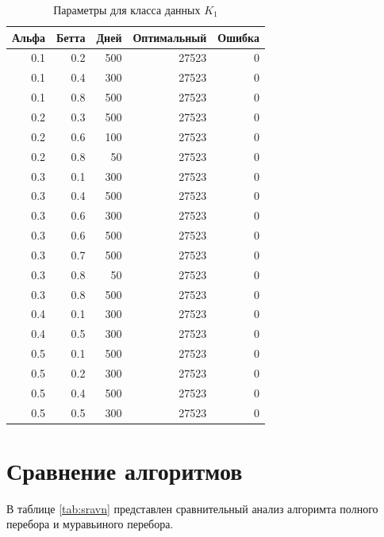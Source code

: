 \begin{table}[!ht]
    \centering
    \caption{\label{tab:par} Параметры для класса данных $K_{1}$}
    \begin{tabular}{|r|r|r|r|r|}
    \hline
        Альфа & Бетта & Дней & Оптимальный & Ошибка  \\ \hline
        0.1 & 0.2 & 500 & 27523 & 0  \\ \hline
        0.1 & 0.4 & 300 & 27523 & 0  \\ \hline
        0.1 & 0.8 & 500 & 27523 & 0  \\ \hline
        0.2 & 0.3 & 500 & 27523 & 0  \\ \hline
        0.2 & 0.6 & 100 & 27523 & 0  \\ \hline
        0.2 & 0.8 & 50 & 27523 & 0  \\ \hline
        0.3 & 0.1 & 300 & 27523 & 0  \\ \hline
        0.3 & 0.4 & 500 & 27523 & 0  \\ \hline
        0.3 & 0.6 & 300 & 27523 & 0  \\ \hline
        0.3 & 0.6 & 500 & 27523 & 0  \\ \hline
        0.3 & 0.7 & 500 & 27523 & 0  \\ \hline
        0.3 & 0.8 & 50 & 27523 & 0  \\ \hline
        0.3 & 0.8 & 500 & 27523 & 0  \\ \hline
        0.4 & 0.1 & 300 & 27523 & 0  \\ \hline
        0.4 & 0.5 & 300 & 27523 & 0  \\ \hline
        0.5 & 0.1 & 500 & 27523 & 0  \\ \hline
        0.5 & 0.2 & 300 & 27523 & 0  \\ \hline
        0.5 & 0.4 & 500 & 27523 & 0  \\ \hline
        0.5 & 0.5 & 300 & 27523 & 0  \\ \hline
    \end{tabular}
\end{table}

\section{Сравнение алгоритмов}
В таблице \ref{tab:sravn} представлен сравнительный анализ алгоримта полного перебора
и муравьиного перебора.

